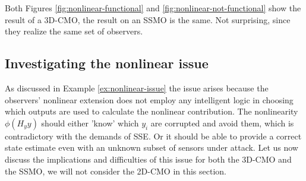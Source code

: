 Both Figures \ref{fig:nonlinear-functional} and \ref{fig:nonlinear-not-functional} show the result of a 3D-CMO, the result on an SSMO is the same. Not surprising, since they realize the same set of observers.

\subsection{Investigating the nonlinear issue}\label{subsec:investigating-nonlinear-issue}
As discussed in Example \ref{ex:nonlinear-issue} the issue arises because the observers' nonlinear extension does not employ any intelligent logic in choosing which outputs are used to calculate the nonlinear contribution. The nonlinearity $\phi(H_yy)$ should either 'know' which $y_i$ are corrupted and avoid them, which is contradictory with the demands of SSE. Or it should be able to provide a correct state estimate even with an unknown subset of sensors under attack. Let us now discuss the implications and difficulties of this issue for both the 3D-CMO and the SSMO, we will not consider the 2D-CMO in this section. 


